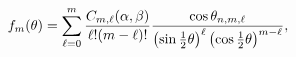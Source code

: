 \[f_{m}(\theta)=\sum_{\ell=0}^{m}\frac{C_{m,\ell}(\alpha,\beta)}{\ell!(m-\ell)!}%
\frac{\mathop{\cos\/}\nolimits\theta_{n,m,\ell}}{\left(\mathop{\sin\/}%
\nolimits\frac{1}{2}\theta\right)^{\ell}\left(\mathop{\cos\/}\nolimits\frac{1}%
{2}\theta\right)^{m-\ell}},\]